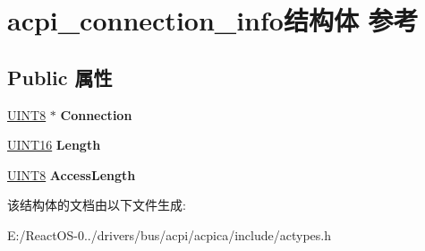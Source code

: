 \hypertarget{structacpi__connection__info}{}\section{acpi\+\_\+connection\+\_\+info结构体 参考}
\label{structacpi__connection__info}
\subsection*{Public 属性}
\begin{DoxyCompactItemize}
\item 
\mbox{\label{structacpi__connection__info_ab0718f5ae70142ab349fdc467818ee89}} 
\hyperlink{_processor_bind_8h_ab27e9918b538ce9d8ca692479b375b6a}{U\+I\+N\+T8} $\ast$ {\bfseries Connection}
\item 
\mbox{\label{structacpi__connection__info_a0fd5dc1c43d285e2d3144848ff62f5fa}} 
\hyperlink{_processor_bind_8h_a09f1a1fb2293e33483cc8d44aefb1eb1}{U\+I\+N\+T16} {\bfseries Length}
\item 
\mbox{\label{structacpi__connection__info_a37e2526f24dd77324812739bcf9aceb8}} 
\hyperlink{_processor_bind_8h_ab27e9918b538ce9d8ca692479b375b6a}{U\+I\+N\+T8} {\bfseries Access\+Length}
\end{DoxyCompactItemize}


该结构体的文档由以下文件生成\+:\begin{DoxyCompactItemize}
\item 
E\+:/\+React\+O\+S-\/0../drivers/bus/acpi/acpica/include/actypes.\+h\end{DoxyCompactItemize}
